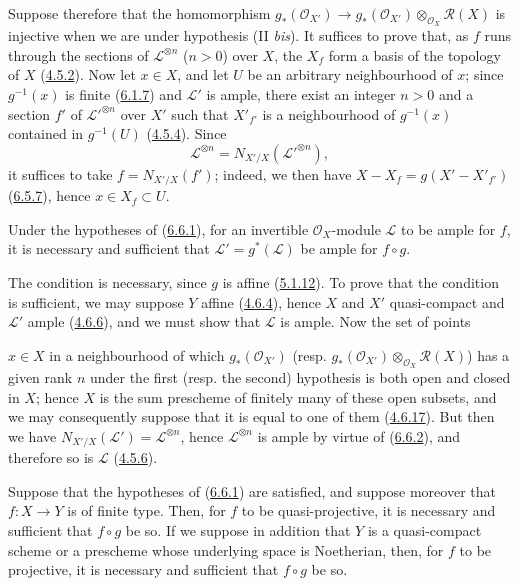 Suppose therefore that the homomorphism
$g_*(\mathcal{O}_{X'})\to
g_*(\mathcal{O}_{X'})\otimes_{\mathcal{O}_X}\mathcal{R}(X)$ is injective
when we are under hypothesis (II \emph{bis}). It suffices to prove that,
as $f$ runs through the sections of $\mathcal{L}^{\otimes n}$ ($n>0$)
over $X$, the $X_f$ form a basis of the topology of $X$
(\hyperref[II.4.5.2]{4.5.2}). Now let $x\in X$, and let $U$ be an arbitrary
neighbourhood of $x$; since $g^{-1}(x)$ is finite
(\hyperref[II.6.1.7]{6.1.7}) and $\mathcal{L}'$ is ample, there exist an
integer $n>0$ and a section $f'$ of ${\mathcal{L}'}^{\otimes n}$ over
$X'$ such that $X'_{f'}$ is a neighbourhood of $g^{-1}(x)$ contained in
$g^{-1}(U)$ (\hyperref[II.4.5.4]{4.5.4}). Since
\[
\mathcal{L}^{\otimes n}=N_{X'/X}({\mathcal{L}'}^{\otimes n}),
\]
it suffices to take $f=N_{X'/X}(f')$; indeed, we then have
$X-X_f=g(X'-X'_{f'})$ (\hyperref[II.6.5.7]{6.5.7}), hence
$x\in X_f\subset U$.

\begin{corollary}[6.6.3]
\label{II.6.6.3}
Under the hypotheses of (\hyperref[II.6.6.1]{6.6.1}), for an invertible
$\mathcal{O}_X$-module $\mathcal{L}$ to be ample for $f$, it is necessary
and sufficient that $\mathcal{L}'=g^*(\mathcal{L})$ be ample for $f\circ g$.
\end{corollary}

The condition is necessary, since $g$ is affine
(\hyperref[II.5.1.12]{5.1.12}). To prove that the condition is
sufficient, we may suppose $Y$ affine (\hyperref[II.4.6.4]{4.6.4}), hence
$X$ and $X'$ quasi-compact and $\mathcal{L}'$ ample
(\hyperref[II.4.6.6]{4.6.6}), and we must show that $\mathcal{L}$ is
ample. Now the set of points


$x\in X$ in a neighbourhood of which $g_*(\mathcal{O}_{X'})$ (resp.
$g_*(\mathcal{O}_{X'})\otimes_{\mathcal{O}_X}\mathcal{R}(X)$) has a given
rank $n$ under the first (resp. the second) hypothesis is both open
and closed in $X$; hence $X$ is the sum prescheme of finitely many of these
open subsets, and we may consequently suppose that it is equal to one of them
(\hyperref[II.4.6.17]{4.6.17}). But then we have
$N_{X'/X}(\mathcal{L}')=\mathcal{L}^{\otimes n}$, hence
$\mathcal{L}^{\otimes n}$ is ample by virtue of
(\hyperref[II.6.6.2]{6.6.2}), and therefore so is $\mathcal{L}$
(\hyperref[II.4.5.6]{4.5.6}).

\begin{corollary}[6.6.4]
\label{II.6.6.4}
Suppose that the hypotheses of
(\hyperref[II.6.6.1]{6.6.1}) are satisfied, and suppose moreover that
$f:X\to Y$ is of finite type. Then, for $f$ to be quasi-projective, it is
necessary and sufficient that $f\circ g$ be so. If we suppose in addition
that $Y$ is a quasi-compact scheme or a prescheme whose underlying space is
Noetherian, then, for $f$ to be projective, it is necessary and sufficient
that $f\circ g$ be so.
\end{corollary}

